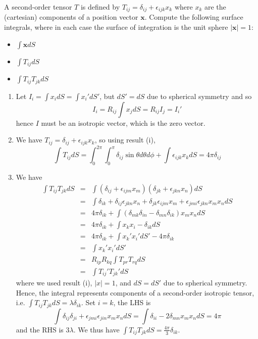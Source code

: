 \documentclass[a4paper]{article}
\begin{document}
\begin{qns}
A second-order tensor $T$ is defined by $T_{ij}=\delta_{ij}+\epsilon_{ijk}x_k$ where $x_k$ are the (cartesian) components of a position vector $\mathbf{x}$. Compute the following surface integrals, where in each case the surface of integration is the unit sphere $|\mathbf{x}|=1$:
\begin{itemize}
    \item $\int\mathbf{x}dS$
    \item $\int T_{ij}dS$
    \item $\int T_{ij}T_{jk}dS$
\end{itemize}
\end{qns}
\begin{ans}\leavevmode
\begin{enumerate}[label=(\roman*)]
\item Let $I_i=\int x_idS=\int x_i'dS'$, but $dS'=dS$ due to spherical symmetry and so
$$I_i=R_{ij}\int x_jdS=R_{ij}I_j=I_i'$$
hence $I$ must be an isotropic vector, which is the zero vector.
\item We have $T_{ij}=\delta_{ij}+\epsilon_{ijk}x_k$, so using result (i),
$$\int T_{ij}dS=\int_0^{2\pi}\int_0^\pi\delta_{ij}\sin\theta d\theta d\phi+\int\epsilon_{ijk}x_kdS=4\pi\delta_{ij}$$
\item We have
\begin{eqnarray}
\int T_{ij}T_{jk}dS&=&\int(\delta_{ij}+\epsilon_{ijm}x_m)(\delta_{jk}+\epsilon_{jkn}x_n)dS\nonumber\\&=&\int\delta_{ik}+\delta_{ij}\epsilon_{jkn}x_n+\delta_{jk}\epsilon_{ijm}x_m+\epsilon_{jmi}\epsilon_{jkn}x_mx_ndS\nonumber\\&=&4\pi\delta_{ik}+\int(\delta_{mk}\delta_{in}-\delta_{mn}\delta_{ik})x_mx_ndS\nonumber\\&=&4\pi\delta_{ik}+\int x_kx_i-\delta_{ik}dS\nonumber\\&=&4\pi\delta_{ik}+\int x_k'x_i'dS'-4\pi\delta_{ik}\nonumber\\&=&\int x_k'x_i'dS'\nonumber\\&=&R_{ip}R_{kq}\int T_{pr}T_{rq}dS\nonumber\\&=&\int T_{ij}'T_{jk}'dS\nonumber
\end{eqnarray}
where we used result (i), $|x|=1$, and $dS=dS'$ due to spherical symmetry. Hence, the integral represents components of a second-order isotropic tensor, i.e. $\int T_{ij}T_{jk}dS=\lambda\delta_{ik}$. Set $i=k$, the LHS is
$$\int\delta_{ij}\delta_{ji}+\epsilon_{jmi}\epsilon_{jin}x_mx_ndS=\int\delta_{ii}-2\delta_{mn}x_mx_ndS=4\pi$$
and the RHS is $3\lambda$. We thus have $\int T_{ij}T_{jk}dS=\frac{4\pi}{3}\delta_{ik}$.
\end{enumerate}
\end{ans}
\end{document}

